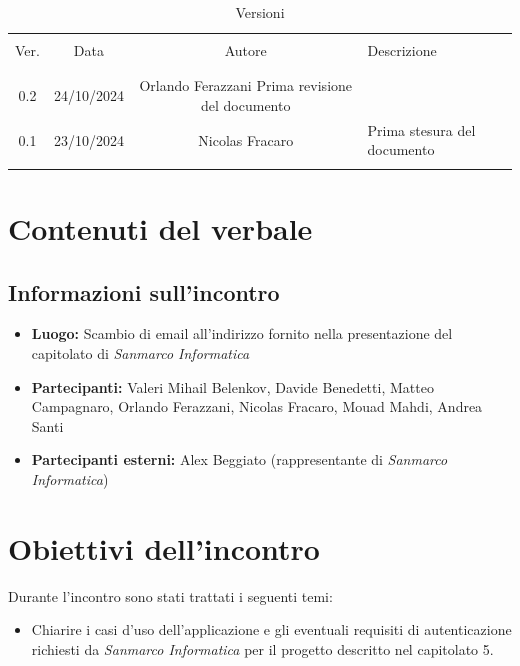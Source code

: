 \documentclass[italian, 12pt]{article}
\begin{document}
\pagestyle{mystyle}


\begin{table}[!h]
	\caption{Versioni}
	\begin{center}
		\begin{tabular}{ c c c p{9cm}}
			\hline \\[-2ex]
			Ver. & Data & Autore & Descrizione \\
			\\[-2ex] \hline \\[-1.5ex]
			0.2 & 24/10/2024 & Orlando Ferazzani Prima revisione del documento \\
			0.1 & 23/10/2024 & Nicolas Fracaro& Prima stesura del documento\\
			\\[-1.5ex] \hline
		\end{tabular}
	\end{center}
\end{table}


\tableofcontents
\newpage

\section{Contenuti del verbale}

\subsection{Informazioni sull'incontro}
\begin{itemize}
    \item \textbf{Luogo:} Scambio di email all'indirizzo fornito nella presentazione del capitolato di \textit{Sanmarco Informatica}
    \item \textbf{Partecipanti:} Valeri Mihail Belenkov, Davide Benedetti, Matteo Campagnaro, Orlando Ferazzani, Nicolas Fracaro, Mouad Mahdi, Andrea Santi
    \item \textbf{Partecipanti esterni:} Alex Beggiato (rappresentante di \textit{Sanmarco Informatica})
\end{itemize}

\section{Obiettivi dell'incontro}
Durante l'incontro sono stati trattati i seguenti temi:
\begin{itemize}
    \item Chiarire i casi d'uso dell'applicazione e gli eventuali requisiti di autenticazione richiesti da \textit{Sanmarco Informatica} per il progetto descritto nel capitolato 5.
\end{itemize}
\end{document}
